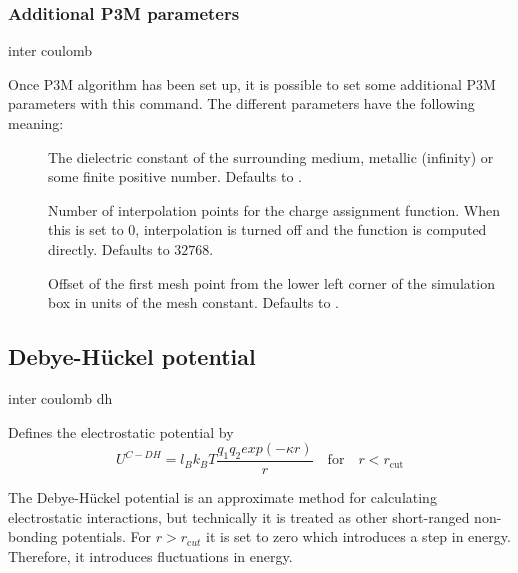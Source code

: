 \subsubsection{Additional P3M parameters}

\begin{essyntax}
  inter coulomb 
   
\end{essyntax}

Once P3M algorithm has been set up, it is possible to set some
additional P3M parameters with this command.  The different parameters
have the following meaning:
\begin{description}
\item[ ] The dielectric constant of the
  surrounding medium, metallic (\ie infinity) or some finite positive
  number.  Defaults to .
\item[ ] Number of interpolation
  points for the charge assignment function.  When this is set to $0$,
  interpolation is turned off and the function is computed directly.
  Defaults to $32768$.
\item[ ] Offset of the first mesh point
  from the lower left corner of the simulation box in units of the
  mesh constant. Defaults to .
\end{description}


\subsection{Debye-H\"uckel potential}

\begin{essyntax}
  inter coulomb  dh \var{\kappa} 
  \begin{features}
  \end{features}
\end{essyntax}

Defines the electrostatic potential by
\begin{equation}
  U^{C-DH} = l_B k_B T \frac{q_1 q_2 exp(-\kappa r)}{r}\quad \mathrm{for}\quad r<r_{\mathrm{cut}}
\end{equation}

The Debye-H\"uckel potential is an approximate method for calculating
electrostatic interactions, but technically it is treated as other
short-ranged non-bonding potentials. For $r>r_{\mathrm cut}$ it is set 
to zero which introduces a step in energy. Therefore, it introduces
fluctuations in energy.

